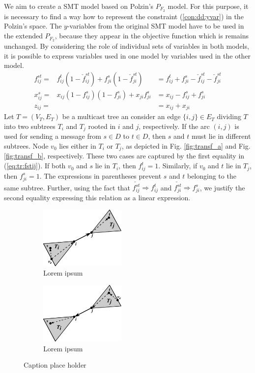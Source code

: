We aim to create a SMT model based on Polzin's $P_{F_2}$ model. For this purpose, it is necessary to find a way how to represent the constraint (\ref{con:dd:yvar}) in the Polzin's space. The $y$-variables from the original SMT model have to be used in the extended $P_{F_2}$, because they appear in the objective function which is remains unchanged. By considering the role of individual sets of variables in both models, it is possible to express variables used in one model by variables used in the other model. 
\begin{subequations}
\begin{align}
\label{eq:tr:fstij}f^{st}_{ij}=&f^t_{ij}(1-\check{f}^{st}_{ij})+f^{s}_{ji}(1-\check{f}^{st}_{ji})
&=  f^t_{ij}+f^s_{ji} - \check{f}^{st}_{ij} - \check{f}^{st}_{ji}\\
\label{eq:tr:xijj}x^s_{ij}=&x_{ij}(1-f^{s}_{ij})(1-f^{s}_{ji})+x_{ji}f^{s}_{ji}
&= x_{ij}-f^s_{ij} + f^{s}_{ji} \\
\label{eq:tr:zij}z_{ij}=&&=x_{ij}+x_{ji}
\end{align}
\end{subequations}
Let $T=(V_T,E_T)$ be a multicast tree an consider an edge $\{i,j\}\in E_T$ dividing $T$ into two subtrees $T_i$ and $T_j$ rooted in $i$ and $j$, respectively.  If the arc $(i,j)$ is used for sending a message from $s\in D$ to $t\in D$, then $s$ and $t$ must lie in different subtrees. Node $v_0$ lies either in $T_i$ or $T_j$, as depicted in Fig. \ref{fig:transf_a} and Fig. \ref{fig:transf_b}, respectively. These two cases are captured by the first equality in (\ref{eq:tr:fstij}). If both $v_0$ and $s$ lie in $T_i$, then $f_{ij}^t=1$. Similarly, if $v_0$ and $t$ lie in $T_j$, then $f_{ji}^s=1$. The expressions in parentheses prevent $s$ and $t$ belonging to the same subtree. Further, using the fact that $\check{f^{st}_{ij}}\Rightarrow f_{ij}^t$ and $\check{f^{st}_{ji}}\Rightarrow f_{ji}^s$, we justify the second equality expressing this relation as a linear expression.
\begin{figure}[h!]
    \centering
    \begin{subfigure}[b]{0.5\textwidth}
        \centering
        \includegraphics[height=1.2in]{transf_a}
        \caption{Lorem ipsum}
    \end{subfigure}%
    \begin{subfigure}[b]{0.5\textwidth}
        \centering
        \includegraphics[height=1.2in]{transf_b}
        \caption{Lorem ipsum}
    \end{subfigure}
    \caption{Caption place holder}
\end{figure}

